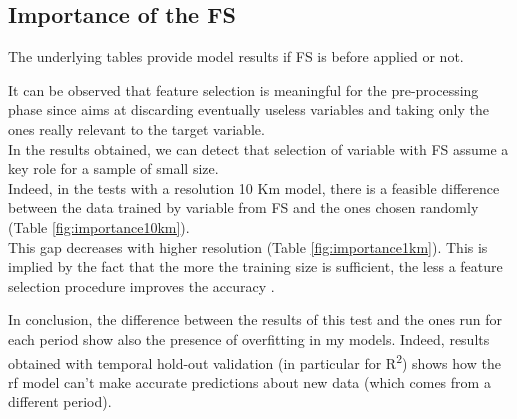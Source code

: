\subsection{Importance of the FS}
The underlying tables provide model results if FS is before applied or not.

It can be observed that feature selection is meaningful for the pre-processing phase since aims at discarding eventually useless variables and taking only the ones really relevant to the target variable. \\
In the results obtained, we can detect that selection of variable with FS assume a key role for a sample of small size.\\ 
Indeed, in the tests with a resolution 10 Km model, there is a feasible difference between the data trained by variable from FS and the ones chosen randomly (Table \ref{fig:importance10km}). \\
This gap decreases with higher resolution (Table \ref{fig:importance1km}).
This is implied by the fact that the more the training size is sufficient, the less a feature selection procedure improves the accuracy \cite{chu2012does}.
\par
In conclusion, the difference between the results of this test and the ones run for each period show also the presence of overfitting in my models. Indeed, results obtained with temporal hold-out validation (in particular for  R\textsuperscript{2}) shows how the \acrshort{rf} model can't make accurate predictions about new data (which comes from a different period).  

\begin{table}[H]
\centering
{}
\\
\caption{Random Forest prediction for PM2.5, including zones with mountains using or not FS.}
\end{table}